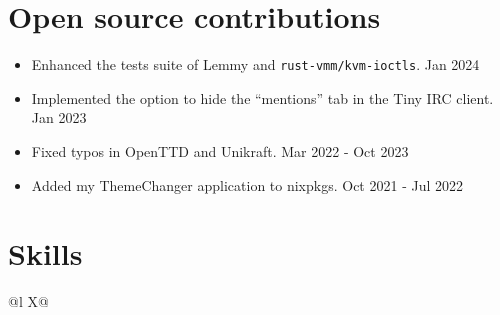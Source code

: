 \documentclass[a4paper,12pt]{article}
\begin{document}
\section{Open source contributions}
\begin{itemize}[nosep,after=\strut, leftmargin=1em, itemsep=3pt]
    \item Enhanced the tests suite of Lemmy and \verb|rust-vmm/kvm-ioctls|. \hfill \faCalendar* Jan 2024
    \item Implemented the option to hide the ``mentions'' tab in the Tiny IRC client. \hfill \faCalendar* Jan 2023
    \item Fixed typos in OpenTTD and Unikraft. \hfill \faCalendar* Mar 2022 - Oct 2023
    \item Added my ThemeChanger application to nixpkgs. \hfill \faCalendar* Oct 2021 - Jul 2022
\end{itemize}
\section{Skills}
\begin{tabularx}{\linewidth}{@{}l X@{}}
\end{tabularx}

\end{document}
